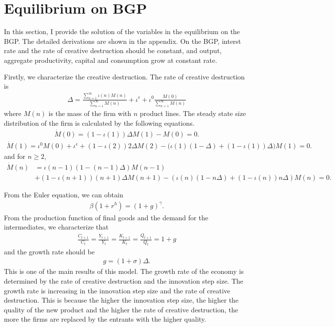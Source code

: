\documentclass[a4paper,12pt]{article}
\begin{document}
\section{Equilibrium on BGP}
In this section, I provide the solution of the variables in the equilibrium on the BGP. The detailed derivations are shown in the appendix. On the BGP, interst rate and the rate of creative destruction should be constant, and output, aggregate productivity,  capital and consumption grow at constant rate. \par
Firstly, we characterize the creative destruction. The rate of creative destruction is
\begin{align}
    \Delta = \frac{\sum_{n=1}^\infty \iota(n)M(n)}{\sum_{n=1}^\infty M(n)}+ \iota^e + \iota^0 \frac{M(0)}{\sum_{n=1}^{\infty}M(n)}
\end{align}
where $M(n)$ is the mass of the firm with $n$ product lines. The steady state size distribution of the firm is calculated by the following equations.
\begin{align}
    \dot{M}(0) = (1-\iota(1))\Delta M(1) - M(0) = 0.
\end{align}
\begin{align}
    \dot{M}(1) = \iota^0 M(0) + \iota^e+(1-\iota(2))2\Delta M(2)-\big(\iota(1)(1-\Delta)+ (1-\iota(1))\Delta \big)M(1) = 0.
\end{align}
and for $n\geq 2$,
\begin{align}
    \dot{M}(n) &= \iota(n-1)(1-(n-1)\Delta)M(n-1)\\
    &+(1-\iota(n+1))(n+1)\Delta M(n+1) - (\iota(n)(1-n\Delta) + (1-\iota(n))n \Delta )M(n) =0.
\end{align}
\par
From the Euler equation, we can obtain 
\begin{align}
    \beta (1+r^h) = (1+g)^\gamma.
\end{align}
From the production function of final goods and the demand for the intermediates, we characterize that
\begin{align}
    \frac{C_{t+1}}{C_t}  = \frac{Y_{t+1}}{Y_t} = \frac{K_{t+1}}{K_t}= \frac{Q_{t+1}}{Q_t} = 1+g
\end{align}
and the growth rate should be
\begin{align}
    g = (1+\sigma)\Delta.
\end{align}
This is one of the main results of this model. The growth rate of the economy is determined by the rate of creative destruction and the innovation step size. The growth rate is increasing in the innovation step size and the rate of creative destruction. This is because the higher the innovation step size, the higher the quality of the new product and the higher the rate of creative destruction, the more the firms are replaced by the entrants with the higher quality. \par
\end{document}
